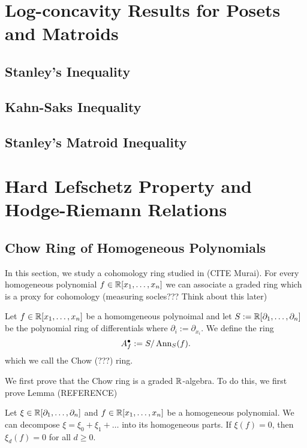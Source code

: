 \documentclass{puthesis-UG}
\begin{document}
\chapter{Log-concavity Results for Posets and Matroids}

\section{Stanley's Inequality}

\section{Kahn-Saks Inequality}

\section{Stanley's Matroid Inequality}


\chapter{Hard Lefschetz Property and Hodge-Riemann Relations}

\section{Chow Ring of Homogeneous Polynomials}

In this section, we study a cohomology ring studied in (CITE Murai). For every homogeneous polynomial $f \in \mathbb{R}[x_1, \ldots, x_n]$ we can associate a graded ring which is a proxy for cohomology (measuring socles??? Think about this later)

\begin{defn}
	Let $f \in \mathbb{R}[x_1, \ldots, x_n]$ be a homomgeneous polynoimal and let $S := \mathbb{R}[\partial_1, \ldots, \partial_n]$ be the polynomial ring of differentials where $\partial_i := \partial_{x_i}$. We define the ring 
	\[
		A_f^\bullet := S / \operatorname{Ann}_S (f).
	\]
	which we call the Chow (???) ring. 
\end{defn}

We first prove that the Chow ring is a graded $\mathbb{R}$-algebra. To do this, we first prove Lemma (REFERENCE)

\begin{lem} \label{homogeneous-parts}
	Let $\xi \in \mathbb{R}[\partial_1, \ldots, \partial_n]$ and $f \in \mathbb{R}[x_1, \ldots, x_n]$ be a homogeneous polynomial. We can decompose $\xi = \xi_0 + \xi_1 + \ldots$ into its homogeneous parts. If $\xi (f) = 0$, then $\xi_d (f) = 0$ for all $d \geq 0$. 
\end{lem}
\end{document}
